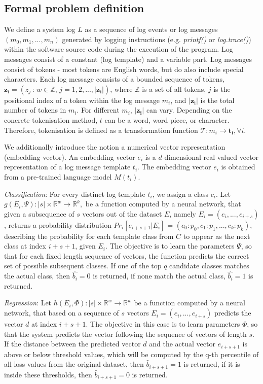 \subsection{Formal problem definition \label{sec:formal_problem_definition}}
We define a system log $L$ as a sequence of log events or log messages $(m_0, m_1, ..., m_n)$ generated by logging instructions (e.g. \textit{printf()} or \textit{log.trace()}) within the software source code during the execution of the program. Log messages consist of a constant (log template) and a variable part.
Log messages consist of tokens - most tokens are English words, but do also include special characters. Each log message consists of a bounded sequence of tokens, $\mathbf{z_i}=(z_{j}\,:\,w \in  \mathbb{Z},\,j=1,2,...,|\mathbf{z_i}|)$, where $\mathbb{Z}$ is a set of all tokens, $j$ is the positional index of a token within the log message $m_i$, and $|\mathbf{z_i}|$ is the total number of tokens in $m_i$. For different $m_i$, $|\mathbf{z_i}|$ can vary. Depending on the concrete tokenisation method, $t$ can be a word, word piece, or character. Therefore, tokenisation is defined as a transformation function $\mathcal{T}: m_i \to \mathbf{t_i}, \forall i$.

We additionally introduce the notion a numerical vector representation (embedding vector). An embedding vector $e_i$ is a $d$-dimensional real valued vector representation of a log message template $t_i$. The embedding vector $e_i$ is obtained from a pre-trained language model $M(t_i)$.

\textit{Classification}: For every distinct log template $t_i$, we assign a class $c_i$. Let $g(E_i, \Psi): \left|s\right| \times \mathbb{R}^w \rightarrow \mathbb{R}^k,$ be a function computed by a neural network, that given a subsequence of $s$ vectors out of the dataset $E$, namely $E_i = (e_i, ..., e_{i+s})$, returns a probability distribution $Pr_i[e_{i+s+1}|E_i]$ = $(c_0: p_0, c_1: p_1, ..., c_k: p_k)$, describing the probability for each template class from $C$ to appear as the next class at index $i+s+1$, given $E_i$. The objective is to learn the parameters $\Psi$, so that for each fixed length sequence of vectors, the function predicts the correct set of possible subsequent classes. If one of the top $q$ candidate classes matches the actual class, then $\hat{b_i} = 0$ is returned, if none match the actual class, $\hat{b_i} = 1$ is returned.

\textit{Regression}: Let $h(E_i, \Phi): \left|s\right| \times \mathbb{R}^w \rightarrow \mathbb{R}^w$ be a function computed by a neural network, that based on a sequence of $s$ vectors $E_i = (e_i, ..., e_{i+s})$ predicts the vector $d$ at index $i+s+1$. The objective in this case is to learn parameters $\Phi$, so that the system predicts the vector following the sequence of vectors of length $s$. If the distance between the predicted vector $d$ and the actual vector $e_{i+s+1}$ is above or below threshold values, which will be computed by the q-th percentile of all loss values from the original dataset, then $\hat{b}_{i+s+1} = 1$ is returned, if it is inside these thresholds, then $\hat{b}_{i+s+1} = 0$ is returned.

